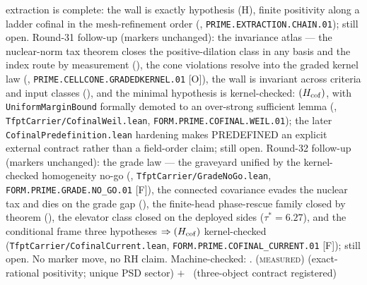 extraction is complete: the wall is exactly hypothesis (H),
finite positivity along a ladder cofinal in the
mesh-refinement order
(,
\texttt{PRIME.EXTRACTION.CHAIN.01}); still open.
Round-31 follow-up (markers unchanged): the invariance atlas ---
the nuclear-norm tax theorem closes the positive-dilation class
in any basis and the index route by measurement
(), the cone violations
resolve into the graded kernel law
(,
\texttt{PRIME.CELLCONE.GRADEDKERNEL.01} [O]), the wall is
invariant across criteria and input classes
(), and the minimal hypothesis
is kernel-checked: $(H_{\rm cof})$, with
\texttt{UniformMarginBound} formally demoted to an over-strong
sufficient lemma (,
\texttt{TfptCarrier/CofinalWeil.lean},
\texttt{FORM.PRIME.COFINAL.WEIL.01}); the later
\texttt{CofinalPredefinition.lean} hardening makes PREDEFINED an
explicit external contract rather than a field-order claim; still
open.
Round-32 follow-up (markers unchanged): the grade law ---
the graveyard unified by the kernel-checked homogeneity no-go
(,
\texttt{TfptCarrier/GradeNoGo.lean},
\texttt{FORM.PRIME.GRADE.NO\_GO.01} [F]), the connected
covariance evades the nuclear tax and dies on the grade gap
(), the finite-head
phase-rescue family closed by theorem
(), the elevator class
closed on the deployed sides ($\tau^* = 6.27$), and the
conditional frame three hypotheses $\Rightarrow (H_{\rm cof})$
kernel-checked (\texttt{TfptCarrier/CofinalCurrent.lean},
\texttt{FORM.PRIME.COFINAL\_CURRENT.01} [F]); still open.  No
marker move, no RH claim.
Machine-checked: .
(\textsc{measured}) (exact-rational positivity; unique PSD sector)
$+$ \mO\ (three-object contract registered)
\par\smallskip


